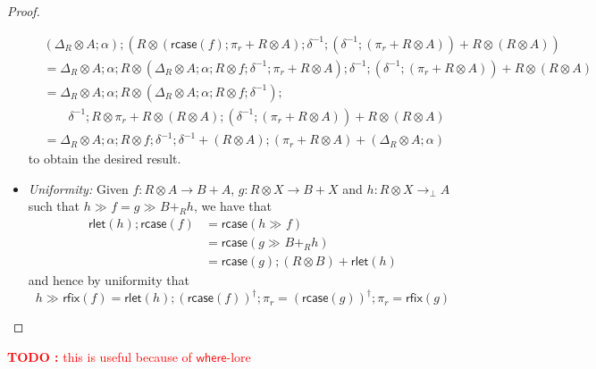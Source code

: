 \documentclass[acmsmall,screen,review]{acmart}
\newcounter{todos}
\newcommand{\TODO}[1]{{
  \stepcounter{todos}
  \begin{center}\large{\textcolor{red}{\textbf{TODO \arabic{todos}:} #1}}\end{center}
}}
\newcommand{\ms}[1]{\ensuremath{\mathsf{#1}}}
\newcommand{\dmor}[1]{{\Delta}_{#1}}
\newcommand{\rlmor}[1]{\ms{rlet}(#1)}
\newcommand{\rcase}[1]{\ms{rcase}(#1)}
\newcommand{\rfix}[1]{\ms{rfix}(#1)}
\newcommand{\rseq}[3]{#2 \gg_{#1} #3}
\begin{document}
\begin{proof}
\begin{itemize}
    \begin{equation}
      \begin{aligned}
        & (\dmor{R} \otimes A ; \alpha )
          ; (
            R \otimes (\rcase{f} ; \pi_r + R \otimes A) ; \delta^{-1} 
              ; (\delta^{-1} ; (\pi_r + R \otimes A)) + R \otimes (R \otimes A)
          ) \\
        & = \dmor{R} \otimes A ; \alpha
          ; R \otimes (\dmor{R} \otimes A ; \alpha ; R \otimes f ; \delta^{-1} 
            ; \pi_r + R \otimes A) 
          ; \delta^{-1} ; (\delta^{-1} ; (\pi_r + R \otimes A)) + R \otimes (R \otimes A) \\
        & = \dmor{R} \otimes A ; \alpha
          ; R \otimes (\dmor{R} \otimes A ; \alpha ; R \otimes f ; \delta^{-1}) ; \\ & \qquad 
            \delta^{-1} ; R \otimes \pi_r + R \otimes (R \otimes A) 
          ; (\delta^{-1} ; (\pi_r + R \otimes A)) + R \otimes (R \otimes A) \\
        & = \dmor{R} \otimes A ; \alpha
          ; R \otimes f
          ; \delta^{-1}
          ; \delta^{-1} + (R \otimes A)
          ; (\pi_r + R \otimes A) + (\dmor{R} \otimes A ; \alpha)
      \end{aligned}
    \end{equation}
    to obtain the desired result.
    \item \emph{Uniformity:} 
    Given $f : R \otimes A \to B + A$, $g : R \otimes X \to B + X$ and $h : R \otimes X \to_\bot A$
    such that $\rseq{}{h}{f} = \rseq{}{g}{B +_R h}$, we have that
    \begin{equation}
      \begin{aligned}
      \rlmor{h} ; \rcase{f} 
      & = \rcase{\rseq{}{h}{f}} \\
      & = \rcase{\rseq{}{g}{B +_R h}} \\ 
      & = \rcase{g} ; (R \otimes B) + \rlmor{h}        
      \end{aligned}
    \end{equation}
    and hence by uniformity that
    \begin{equation}
      \rseq{}{h}{\rfix{f}} 
      = \rlmor{h} ; (\rcase{f})^\dagger ; \pi_r
      = (\rcase{g})^\dagger ; \pi_r 
      = \rfix{g}
    \end{equation}
  \end{itemize}
\end{proof}

\TODO{this is useful because of \ms{where}-lore}
\end{document}
